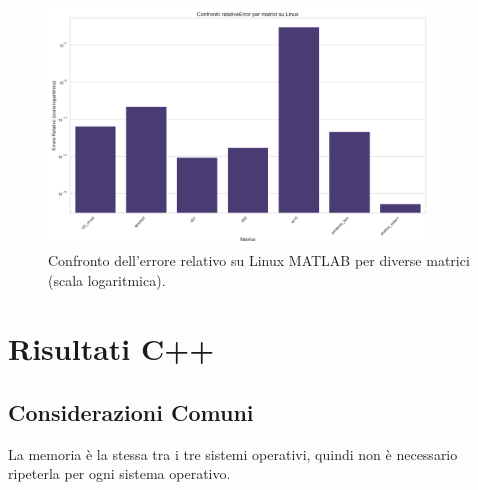 \begin{figure}[H]
    \centering
    \includegraphics[width=0.9\textwidth]{images/MATLAB/Linux/relativeError_comparison}
    \caption{Confronto dell'errore relativo su Linux MATLAB per diverse matrici (scala logaritmica).}
    \label{fig:matlab-linux-error-comparison}
\end{figure}

\section{Risultati C++}

\subsection{Considerazioni Comuni}

La memoria è la stessa tra i tre sistemi operativi, quindi non è necessario ripeterla per ogni sistema operativo.

